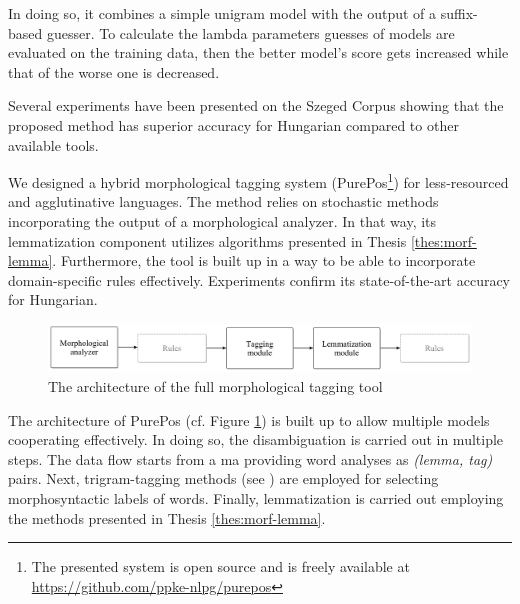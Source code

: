 In doing so, it combines a simple unigram model with the output of a suffix-based guesser. 
To calculate the lambda parameters guesses of models are evaluated on the training data, then the better model's score gets increased while that of the worse one is decreased.

Several experiments have been presented on the Szeged Corpus showing that the proposed method has superior accuracy for Hungarian compared to other available tools. 

\thesisline%


\begin{core}
\begin{thesis}\label{thes:morf-tagging}
We designed a hybrid morphological tagging system (PurePos\footnote{The presented system is open source and is freely available at \href{https://github.com/ppke-nlpg/purepos}{https://github.com/ppke-nlpg/purepos}}) for less-resourced and agglutinative languages.
The method relies on stochastic methods incorporating the output of a morphological analyzer.
In that way, its lemmatization component utilizes algorithms presented in Thesis \ref{thes:morf-lemma}.
Furthermore, the tool is built up in a way to be able to incorporate domain-specific rules effectively.
Experiments confirm its state-of-the-art accuracy for Hungarian.
\end{thesis}

\begin{pub}
\cite{Orosz2011,Orosz2012,Orosz2012a,Orosz2013a}
\end{pub}
\end{core}

\begin{figure}[ht] 
  \centering
  \includegraphics[width=1\textwidth]{MorphTagging/architecture.png} 
  \caption{The architecture of the full morphological tagging tool}
  \label{fig:purepos-arch_en}
\end{figure}

The architecture of PurePos (cf. Figure \ref{fig:purepos-arch_en}) is built up to allow multiple models cooperating effectively. 
In doing so, the disambiguation is carried out in multiple steps.
The data flow starts from a \acrshort{ma} providing word analyses as \emph{(lemma, tag)} pairs. 
Next, trigram-tagging methods (see \cite{Brants2000,Halacsy2007}) are employed for selecting morphosyntactic labels of words. 
Finally, lemmatization is carried out employing the methods presented in Thesis \ref{thes:morf-lemma}. 

